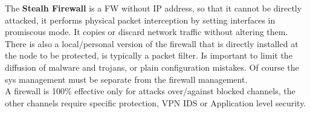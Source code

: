 \documentclass[12pt]{article}
\begin{document}
The \textbf{Stealh Firewall} is a FW without IP address, so that it cannot be directly attacked, it performs physical packet interception by setting interfaces in promiscous mode. It copies or discard network traffic without altering them.\\
There is also a local/personal version of the firewall that is directly installed at the node to be protected, is typically a packet filter. Is important to limit the diffusion of malware and trojans, or plain configuration mistakes. Of course the sys management must be separate from the firewall management.\\

A firewall is 100\% effective only for attacks over/against blocked channels, the other channels require specific protection, VPN IDS or Application level security.
\end{document}
